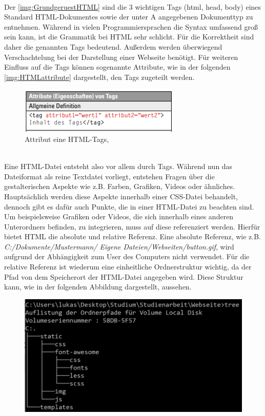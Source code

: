 \documentclass[a4paper,titlepage,halfparskip,12pt]{scrreprt}
\begin{document}
\begin{onehalfspacing}
\\Der \autoref{img:GrundgeruestHTML} sind die 3 wichtigen Tags (html, head, body) eines Standard \ac{HTML}-Dokumentes sowie der unter A angegebenen Dokumenttyp zu entnehmen. Während in vielen Programmiersprachen die Syntax umfassend groß sein kann, ist die Grammatik bei HTML sehr schlicht. Für die Korrektheit sind daher die genannten Tags bedeutend. Außerdem werden überwiegend Verschachtelung bei der Darstellung einer Webseite benötigt. Für weiteren Einfluss auf die Tags können sogenannte Attribute, wie in der folgenden \autoref{img:HTMLattribute} dargestellt, den Tags zugeteilt werden. 
\begin{figure}[h]
	\centering
	\includegraphics[scale=2.5]{images/HTMLattribute}
	\caption{Attribut eine \ac{HTML}-Tags, \cite{buhler2017html5}}
	\label{img:HTMLattribute}
\end{figure}
\\Eine \ac{HTML}-Datei entsteht also vor allem durch Tags. Während nun das Dateiformat als reine Textdatei vorliegt, entstehen Fragen über die gestalterischen Aspekte wie z.B. Farben, Grafiken, Videos oder ähnliches. Hauptsächlich werden diese Aspekte innerhalb einer \ac{CSS}-Datei behandelt, dennoch gibt es dafür auch Punkte, die in einer \ac{HTML}-Datei zu beachten sind. Um beispielsweise Grafiken oder Videos, die sich innerhalb eines anderen Unterordners befinden, zu integrieren, muss auf diese referenziert werden. Hierfür bietet \ac{HTML} die absolute und relative Referenz. Eine absolute Referenz, wie z.B. \textit{C:/Dokumente/Mustermann/ Eigene Dateien/Webseiten/button.gif}, wird aufgrund der Abhängigkeit zum User des Computers nicht verwendet. Für die relative Referenz ist wiederum eine einheitliche Ordnerstruktur wichtig, da der Pfad von dem Speicherort der \ac{HTML}-Datei angegeben wird. Diese Struktur kann, wie in der folgenden Abbildung dargestellt, aussehen.
\begin{figure}[h]
	\centering
	\includegraphics[scale=0.8]{images/TreeHTMLStruktur}

\end{figure}
\end{onehalfspacing}
\end{document}
